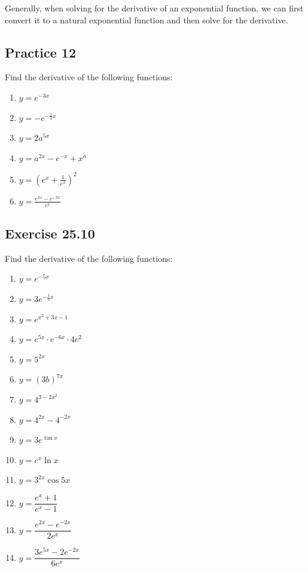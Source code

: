 \documentclass[12pt]{report}
\begin{document}
Generally, when solving for the derivative of an exponential function, we can
first convert it to a natural exponential function and then solve for the
derivative.

\subsection*{Practice 12}

Find the derivative of the following functions: \setlength{\columnseprule}{1pt}
\setlength{\columnsep}{24pt}
\begin{multicols}{2}
  \begin{enumerate}
    \item $y=e^{-3x}$
    \item $y=-e^{-{\frac{1}{3}x}}$
    \item $y=2a^{5x}$
    \item $y=a^{2x}-e^{-x}+x^{a}$
    \item $y=\left(e^{x}+{\frac{1}{e^{x}}}\right)^{2}$
    \item $y={\frac{e^{3x}-e^{-3x}}{e^{x}}}$
  \end{enumerate}
\end{multicols}

\subsection*{Exercise 25.10}

Find the derivative of the following functions: \setlength{\columnseprule}{1pt}
\setlength{\columnsep}{24pt}
\begin{multicols}{2}
  \begin{enumerate}
    \item $y=e^{-5x}$
    \item $y=3e^{-{\frac{1}{3}}x}$
    \item $y=e^{x^{2}+3x-1}$
    \item $y=e^{5x}\cdot e^{-6x}\cdot4e^{2}$
    \item $y=5^{2x}$
    \item $y=(3b)^{7x}$
    \item $y=4^{3-2x^2}$
    \item $y=4^{2x}-4^{-2x}$
    \item $y=3e^{\tan x}$
    \item $y=e^{x}\ln x$
    \item $y=3^{2x}\cos5x$
    \item $y={\dfrac{e^{x}+1}{e^{x}-1}}$
    \item $y={\dfrac{e^{2x}-e^{-2x}}{2e^{x}}}$
    \item $y={\dfrac{3e^{5x}-2e^{-2x}}{6e^{x}}}$
  \end{enumerate}
\end{multicols}
\end{document}
